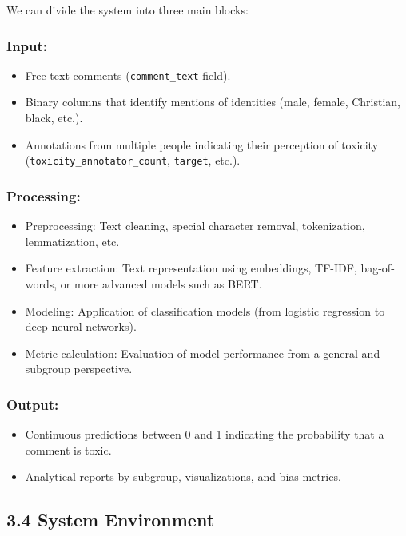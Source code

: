 \documentclass[a4paper,12pt]{article}
\begin{document}
We can divide the system into three main blocks:

\subsubsection*{Input:}
\begin{itemize}
    \item Free-text comments (\texttt{comment\_text} field).
    \item Binary columns that identify mentions of identities (male, female, Christian, black, etc.).
    \item Annotations from multiple people indicating their perception of toxicity (\texttt{toxicity\_annotator\_count}, \texttt{target}, etc.).
\end{itemize}

\subsubsection*{Processing:}
\begin{itemize}
    \item Preprocessing: Text cleaning, special character removal, tokenization, lemmatization, etc.
    \item Feature extraction: Text representation using embeddings, TF-IDF, bag-of-words, or more advanced models such as BERT.
    \item Modeling: Application of classification models (from logistic regression to deep neural networks).
    \item Metric calculation: Evaluation of model performance from a general and subgroup perspective.
\end{itemize}

\subsubsection*{Output:}
\begin{itemize}
    \item Continuous predictions between 0 and 1 indicating the probability that a comment is toxic.
    \item Analytical reports by subgroup, visualizations, and bias metrics.
\end{itemize}

\subsection*{3.4 System Environment}
\end{document}
